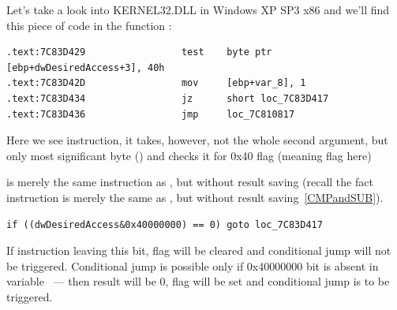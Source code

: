 
{Let's take a look into KERNEL32.DLL in Windows XP SP3 x86 and we'll find
this piece of code in the function :}

\begin{lstlisting}
.text:7C83D429                 test    byte ptr [ebp+dwDesiredAccess+3], 40h
.text:7C83D42D                 mov     [ebp+var_8], 1
.text:7C83D434                 jz      short loc_7C83D417
.text:7C83D436                 jmp     loc_7C810817
\end{lstlisting}

{Here we see \TEST instruction, it takes, however, not the whole second argument,
but only most significant byte () and checks it for 0x40 flag
(meaning  flag here)}

{\TEST is merely the same instruction as \AND, but without result saving 
(recall the fact \CMP instruction is merely the same as \SUB, but without result saving}~\ref{CMPandSUB}).


\begin{lstlisting}
if ((dwDesiredAccess&0x40000000) == 0) goto loc_7C83D417
\end{lstlisting}

{If \AND instruction leaving this bit, \ZF flag will be cleared and \JZ conditional jump will not be triggered.
Conditional jump is possible only if 0x40000000 bit is absent in  variable ~--- then \AND result will be 0, \ZF flag will be set and conditional jump is to be triggered.}

